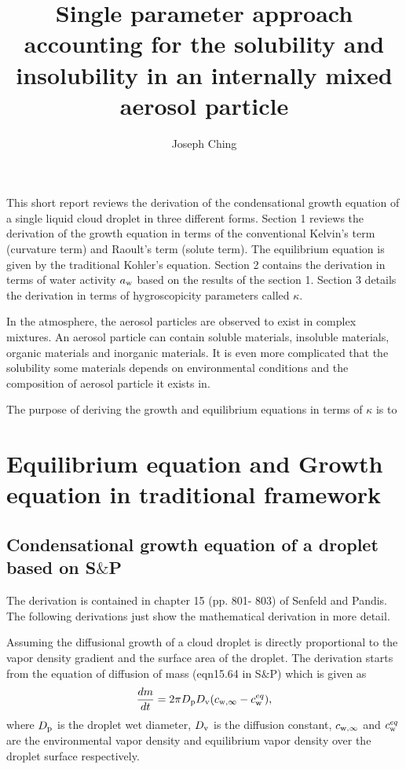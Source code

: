 \documentclass[12pt]{article}
\title{Single parameter approach accounting for the solubility and insolubility in an internally mixed aerosol particle}
\author{Joseph Ching}
\begin{document}
\maketitle
\tableofcontents


This short report reviews the derivation of the condensational growth equation of a single liquid cloud droplet in three different forms. Section 1 reviews the derivation of the growth equation in terms of the conventional Kelvin's term (curvature term) and Raoult's term (solute term). The equilibrium equation is given by the traditional Kohler's equation. Section 2 contains the derivation in terms of water activity $a_{\rm w}$ based on the results of the section 1. Section 3 details the derivation in terms of hygroscopicity parameters called $\kappa$. 

In the atmosphere, the aerosol particles are observed to exist in complex mixtures. An aerosol particle can contain  soluble materials,  insoluble materials, organic materials and inorganic materials. It is even more complicated that the solubility some materials depends on environmental conditions and the composition of aerosol particle it exists in. 

The purpose of deriving the growth and equilibrium equations in terms of $\kappa$ is to 

\section{Equilibrium equation and Growth equation in traditional framework}

\subsection{Condensational growth equation of a droplet based on S$\&$P}

The derivation is contained in chapter 15 (pp. 801- 803) of Senfeld and Pandis. The following derivations just show the mathematical derivation in more detail.

Assuming the diffusional growth of a cloud droplet is directly proportional to the vapor density gradient and the surface area of the droplet. The derivation starts from the equation of diffusion of mass (eqn15.64 in S$\&$P) which is given as
\begin{equation}\label{eqn:1.1}
\frac{dm}{dt}=2 \pi D_{\rm p} D_{\rm v} (c_{\rm w, \infty} - c_{\rm w}^{eq}),  
\end{equation}
where $D_{\rm p}$ is the droplet wet diameter, $D_{\rm v}$ is the diffusion constant, $c_{\rm w, \infty}$ and $c^{eq}_{\rm w}$ are the environmental vapor density and equilibrium vapor density over the droplet surface respectively.
\end{document}
